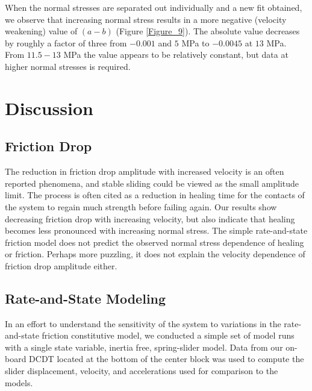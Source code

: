 When the normal stresses are separated out individually and a new fit obtained, we observe that increasing normal stress results in a more negative (velocity weakening) value of $(a-b)$ (Figure \ref{Figure_9}). The absolute value decreases by roughly a factor of three from $-0.001$ and $5$ MPa to $-0.0045$ at $13$ MPa. From $11.5-13$ MPa the value appears to be relatively constant, but data at higher normal stresses is required.

\section{Discussion}

\subsection{Friction Drop}
The reduction in friction drop amplitude with increased velocity is an often reported phenomena, and stable sliding could be viewed as the small amplitude limit. The process is often cited as a reduction in healing time for the contacts of the system to regain much strength before failing again. Our results show decreasing friction drop with increasing velocity, but also indicate that healing becomes less pronounced with increasing normal stress. The simple rate-and-state friction model does not predict the observed normal stress dependence of healing or friction. Perhaps more puzzling, it does not explain the velocity dependence of friction drop amplitude either.

\subsection{Rate-and-State Modeling}

In an effort to understand the sensitivity of the system to variations in the rate-and-state friction constitutive model, we conducted a simple set of model runs with a single state variable, inertia free, spring-slider model. Data from our on-board DCDT located at the bottom of the center block was used to compute the slider displacement, velocity, and accelerations used for comparison to the models.

